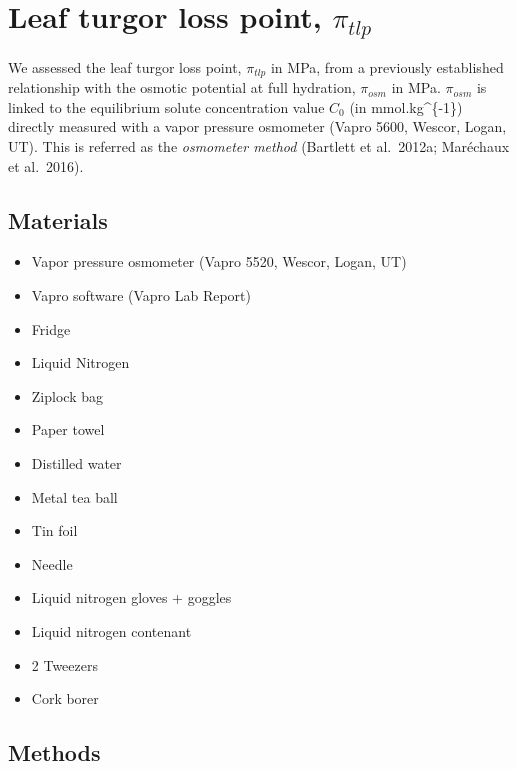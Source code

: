 \documentclass[
  12pt,
  american,
  a4paper,
  extrafontsizes,onecolumn,openright
  ]{memoir}
\providecommand{\tightlist}{%
  \setlength{\itemsep}{0pt}\setlength{\parskip}{0pt}}
\begin{document}
\hypertarget{leaf-turgor-loss-point-pi_tlp}{%
\section{\texorpdfstring{Leaf turgor loss point, \(\pi_{tlp}\)}{Leaf turgor loss point, \textbackslash pi\_\{tlp\}}}\label{leaf-turgor-loss-point-pi_tlp}}

We assessed the leaf turgor loss point, \(\pi_{tlp}\) in MPa, from a previously established relationship with the osmotic potential at full hydration, \(\pi_{osm}\) in MPa. \(\pi_{osm}\) is linked to the equilibrium solute concentration value \(C_0\) (in mmol.kg\^{}\{-1\}) directly measured with a vapor pressure osmometer (Vapro 5600, Wescor, Logan, UT). This is referred as the \emph{osmometer method} (Bartlett et al.~2012a; Maréchaux et al.~2016).

\hypertarget{materials}{%
\subsection{Materials}\label{materials}}

\begin{itemize}
\tightlist
\item
  Vapor pressure osmometer (Vapro 5520, Wescor, Logan, UT)
\item
  Vapro software (Vapro Lab Report)
\item
  Fridge
\item
  Liquid Nitrogen
\item
  Ziplock bag\\
\item
  Paper towel
\item
  Distilled water
\item
  Metal tea ball
\item
  Tin foil
\item
  Needle\\
\item
  Liquid nitrogen gloves + goggles
\item
  Liquid nitrogen contenant
\item
  2 Tweezers
\item
  Cork borer
\end{itemize}

\hypertarget{methods}{%
\subsection{Methods}\label{methods}}
\end{document}
